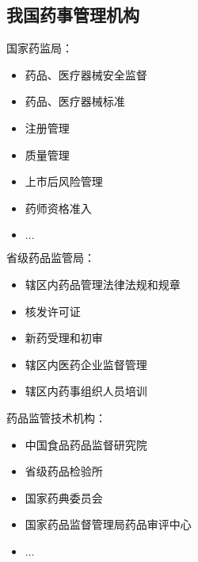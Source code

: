\subsection{我国药事管理机构}%
\label{sub:我国药事管理机构}
\begin{notation}    
    国家药监局：
    \begin{itemize}
        \item 药品、医疗器械安全监督
        \item 药品、医疗器械标准
        \item 注册管理
        \item 质量管理
        \item 上市后风险管理
        \item 药师资格准入
        \item $\ldots $
    \end{itemize}
\end{notation}
\begin{notation}
    省级药品监管局：
    \begin{itemize}
        \item 辖区内药品管理法律法规和规章
        \item 核发许可证
        \item 新药受理和初审
        \item 辖区内医药企业监督管理
        \item 辖区内药事组织人员培训
    \end{itemize}
\end{notation}
\begin{notation}
    药品监管技术机构：
    \begin{itemize}
        \item 中国食品药品监督研究院
        \item 省级药品检验所
        \item 国家药典委员会
        \item 国家药品监督管理局药品审评中心
        \item $\ldots $
    \end{itemize}
\end{notation}
